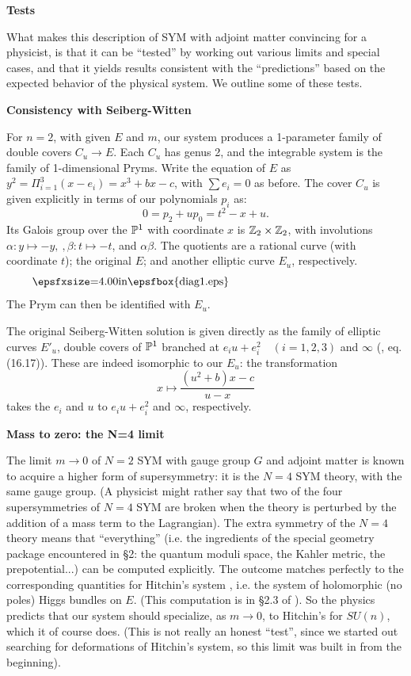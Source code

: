 \medskip\noindent
{\bf Tests}

What makes this description of SYM with adjoint matter 
convincing for a
physicist, is that it can be ``tested'' by working out 
various limits and
special cases, and that it yields results consistent 
with the ``predictions'' 
based on the expected behavior of the physical system.  
We outline some of these
tests.

\medskip\noindent
{\bf Consistency with Seiberg-Witten}

For $n=2$, with given $E$ and $m$, our system produces 
a 1-parameter family
of double covers $C_u\to E$.  Each $C_u$ has genus 2, 
and the
integrable system is the family of 1-dimensional Pryms.  
Write the
equation of $E$ as 
$y^2 = \Pi^3_{i=1}(x-e_i) = x^3 + bx-c$, with 
$\sum e_i = 0$ as before.  The cover $C_u$ is given 
explicitly in terms of our polynomials $p_i$ as:
$$
0 = p_2 + up_0 = t^2-x+u.
$$
Its Galois group over the ${\Bbb P}^1$ with coordinate 
$x$ is ${\Bbb Z}_2\times{\Bbb Z}_2$, 
with involutions 
$\alpha:y\mapsto -y,\ , \beta: t\mapsto -t$, 
and $\alpha\beta$.
The quotients are a rational curve 
(with coordinate $t$); the original $E$; 
and another elliptic curve $E_u$, respectively.
$$
\vbox{
\epsfxsize=4.00in\epsfbox{diag1.eps}}
$$
\noindent 
The Prym can then be identified with $E_u$.

The original Seiberg-Witten solution is given directly as the
family of elliptic curves $E'_u$, double covers of ${\Bbb P}^1$ 
branched
at $e_i u + e_i^2 \quad (i=1,2,3)$ and 
$\infty$ (\cite{SW2}, eq. (16.17)).  These are
indeed isomorphic to our $E_u$: the transformation
$$
x\mapsto \frac{(u^2+b)x-c}{u-x}
$$
takes the $e_i$ and $u$ to $e_i u+e_i^2$ and
 $\infty$, respectively.

\medskip\noindent
{\bf Mass to zero: the N=4 limit}

The limit $m\to 0$ of $N=2$ SYM with gauge 
group $G$ and adjoint
matter is known to acquire a higher form of 
supersymmetry:  it is the 
$N=4$ SYM theory, with the same gauge group.  
(A physicist might rather
say that two of the four supersymmetries of $N=4$ SYM are 
broken when the theory is perturbed by the addition of a
mass term to the Lagrangian).
The extra symmetry of the $N=4$ theory means that 
``everything'' (i.e. the
ingredients of the special geometry package 
encountered in \S 2:  the quantum
moduli space, the Kahler metric, the prepotential...) 
can be computed
explicitly.  The outcome matches perfectly to the 
corresponding quantities for
Hitchin's system \cite{Hi}, i.e. the system of
 holomorphic (no poles)
Higgs bundles on $E$.  (This computation is in 
\S 2.3 of \cite{DW}).  So the
physics predicts that our system should specialize, 
as $m \to 0$, to Hitchin's for
$SU(n)$, which it of course does.  (This is not 
really an honest ``test'', since
we started out searching for deformations of 
Hitchin's system, so this
limit was built in from the beginning).

